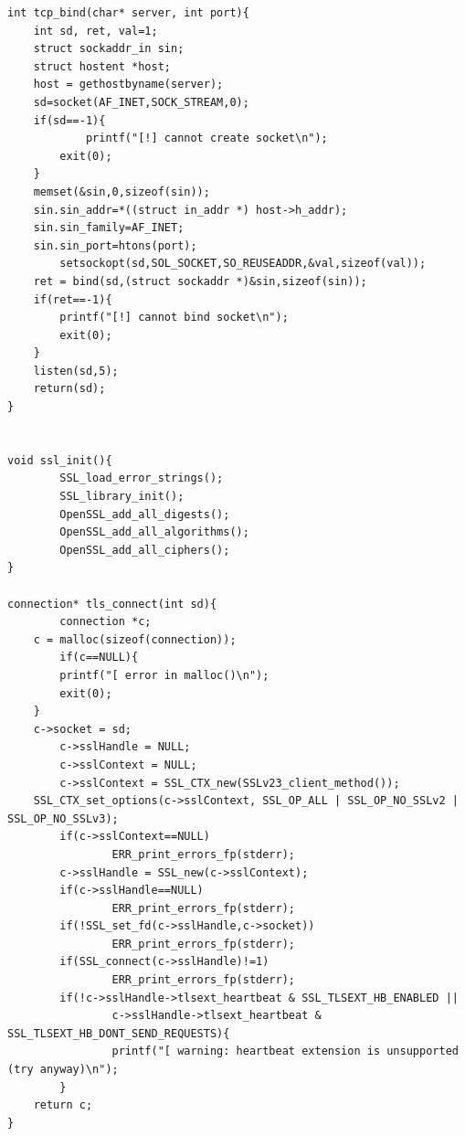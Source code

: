 \documentclass[11t]{article}
\begin{document}
\begin{lstlisting}[breaklines=true]
int tcp_bind(char* server, int port){
	int sd, ret, val=1;
	struct sockaddr_in sin;
	struct hostent *host;
	host = gethostbyname(server);
	sd=socket(AF_INET,SOCK_STREAM,0);
	if(sd==-1){
    		printf("[!] cannot create socket\n");
		exit(0);
	}
	memset(&sin,0,sizeof(sin));
	sin.sin_addr=*((struct in_addr *) host->h_addr);
	sin.sin_family=AF_INET;
	sin.sin_port=htons(port);
    	setsockopt(sd,SOL_SOCKET,SO_REUSEADDR,&val,sizeof(val));
	ret = bind(sd,(struct sockaddr *)&sin,sizeof(sin));
	if(ret==-1){
		printf("[!] cannot bind socket\n");
		exit(0);
	}
	listen(sd,5);
	return(sd);
}


void ssl_init(){
        SSL_load_error_strings();
        SSL_library_init();
        OpenSSL_add_all_digests();
        OpenSSL_add_all_algorithms();
        OpenSSL_add_all_ciphers();
}

connection* tls_connect(int sd){
        connection *c;
	c = malloc(sizeof(connection));
        if(c==NULL){
		printf("[ error in malloc()\n");
		exit(0);
	}
	c->socket = sd;
        c->sslHandle = NULL;
        c->sslContext = NULL;
        c->sslContext = SSL_CTX_new(SSLv23_client_method());
	SSL_CTX_set_options(c->sslContext, SSL_OP_ALL | SSL_OP_NO_SSLv2 | SSL_OP_NO_SSLv3);
        if(c->sslContext==NULL)
                ERR_print_errors_fp(stderr);
        c->sslHandle = SSL_new(c->sslContext);
        if(c->sslHandle==NULL)
                ERR_print_errors_fp(stderr);
        if(!SSL_set_fd(c->sslHandle,c->socket))
                ERR_print_errors_fp(stderr);
        if(SSL_connect(c->sslHandle)!=1)
                ERR_print_errors_fp(stderr);
        if(!c->sslHandle->tlsext_heartbeat & SSL_TLSEXT_HB_ENABLED ||
                c->sslHandle->tlsext_heartbeat & SSL_TLSEXT_HB_DONT_SEND_REQUESTS){
                printf("[ warning: heartbeat extension is unsupported (try anyway)\n");
        }
	return c;
}


\end{lstlisting}
\end{document}
